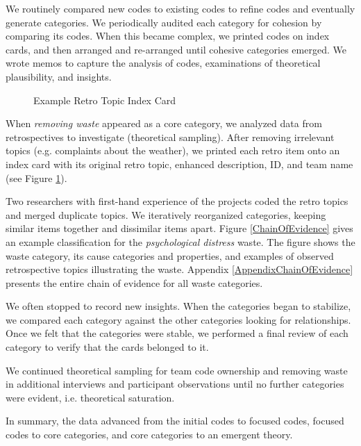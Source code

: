 We routinely compared new codes to existing codes to refine codes and eventually generate categories. We periodically audited each category for cohesion by comparing its codes. When this became complex, we printed codes on index cards, and then arranged and re-arranged until cohesive categories emerged. We wrote memos to capture the analysis of codes, examinations of theoretical plausibility, and insights.

\begin{figure}[t]
\centering
{}
\caption{Example Retro Topic Index Card}
\label{exampleRetroTopicl}
\end{figure}

 When \textit{removing waste} appeared as a core category, we analyzed data from retrospectives to investigate (theoretical sampling). After removing irrelevant topics (e.g. complaints about the weather), we printed each retro item onto an index card with its original retro topic, enhanced description, ID, and team name (see Figure \ref{exampleRetroTopicl}).

Two researchers with first-hand experience of the projects coded the retro topics and merged duplicate topics. We iteratively reorganized categories, keeping similar items together and dissimilar items apart. Figure \ref{ChainOfEvidence} gives an example classification for the \textit{psychological distress} waste. The figure shows the waste category, its cause categories and properties, and examples of observed retrospective topics illustrating the waste.  Appendix \ref{AppendixChainOfEvidence} presents the entire chain of evidence for all waste categories.

We often stopped to record new insights. When the categories began to stabilize, we compared each category against the other categories looking for relationships. Once we felt that the categories were stable, we performed a final review of each category to verify that the cards belonged to it.

We continued theoretical sampling for team code ownership and removing waste in additional interviews and participant observations until no further categories were evident, i.e. theoretical saturation. 

In summary, the data advanced from the initial codes to focused codes, focused codes to core categories, and core categories to an emergent theory. 


